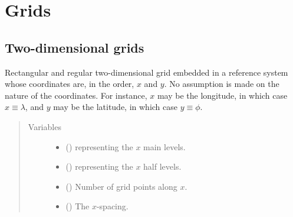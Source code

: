\documentclass[letterpaper,10pt,english]{sphinxmanual}
\begin{document}
\section{Grids}
\label{\detokenize{api:grids}}

\subsection{Two-dimensional grids}
\label{\detokenize{api:two-dimensional-grids}}

\begin{fulllineitems}
\label{\detokenize{api:grids.grid_xy.GridXY}}
Rectangular and regular two-dimensional grid embedded in a reference system whose coordinates are,
in the order, \(x\) and \(y\). No assumption is made on the nature of the coordinates. For
instance, \(x\) may be the longitude, in which case \(x \equiv \lambda\), and \(y\) may
be the latitude, in which case \(y \equiv \phi\).
\begin{quote}\begin{description}
\item[{Variables}] \leavevmode\begin{itemize}
\item {} 
{\hyperref[\detokenize{api:grids.grid_xyz.GridXYZ.x}]{}} () \textendash{} {\hyperref[\detokenize{api:grids.axis.Axis}]{}} representing the \(x\) main levels.

\item {} 
{\hyperref[\detokenize{api:grids.grid_xyz.GridXYZ.x_half_levels}]{}} () \textendash{} {\hyperref[\detokenize{api:grids.axis.Axis}]{}} representing the \(x\) half levels.

\item {} 
{\hyperref[\detokenize{api:grids.grid_xyz.GridXYZ.nx}]{}} () \textendash{} Number of grid points along \(x\).

\item {} 
{\hyperref[\detokenize{api:grids.grid_xyz.GridXYZ.dx}]{}} () \textendash{} The \(x\)-spacing.


\end{itemize}
\end{description}
\end{quote}
\end{fulllineitems}
\end{document}
